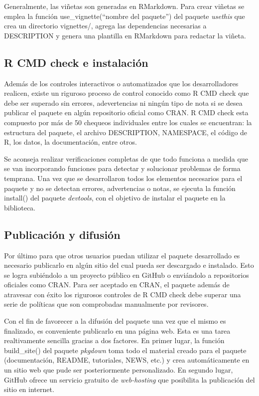 Generalmente, las viñetas son generadas en RMarkdown. Para crear viñetas se emplea la función \textcolor{fandango}{use\_vignette(``nombre del paquete'')} del paquete \emph{usethis} que crea un directorio vignettes/, agrega las dependencias necesarias a DESCRIPTION y genera una plantilla en RMarkdown para redactar la viñeta. 


\subsection{R CMD check e instalación}
Además de los controles interactivos o automatizados que los desarrolladores realicen, existe un riguroso proceso de control conocido como R CMD check que debe ser superado sin errores, adevertencias ni ningún tipo de nota si se desea publicar el paquete en algún repositorio oficial como CRAN. R CMD check esta compuesto por más de 50 chequeos individuales entre los cuales se encuentran: la estructura del paquete, el archivo DESCRIPTION, NAMESPACE, el código de R, los datos, la documentación, entre otros.  

Se aconseja realizar verificaciones completas de que todo funciona a medida que se van incorporando funciones para detectar y solucionar problemas de forma temprana. Una vez que se desarrollaron todos los elementos necesarios para el paquete y no se detectan errores, advertencias o notas, se ejecuta la función \textcolor{fandango}{install()} del paquete \emph{devtools}, con el objetivo de instalar el paquete en la biblioteca.


\subsection{Publicación y difusión}

Por último para que otros usuarios puedan utilizar el paquete desarrollado es necesario publicarlo en algún sitio del cual pueda ser descargado e instalado. Esto se logra subiéndolo a un proyecto público en GitHub o enviándolo a repositorios oficiales como CRAN. Para ser aceptado en CRAN, el paquete además de atravesar con éxito los rigurosos controles de R CMD check debe superar una serie de políticas que son comprobadas manualmente por revisores. 

Con el fin de favorecer a la difusión del paquete una vez que el mismo es finalizado, es conveniente publicarlo en una página web. Esta es una tarea realtivamente sencilla gracias a dos factores. En primer lugar, la función \textcolor{fandango}{build\_site()} del paquete \emph{pkgdown} \citep{HadleyHesselberth2020} toma todo el material creado para el paquete (documentación, README, tutoriales, NEWS, etc.) y crea automáticamente en un sitio web que pude ser posteriormente personalizado. En segundo lugar, GitHub ofrece un servicio gratuito de \emph{web-hosting} que posibilita la publicación del sitio en internet.

